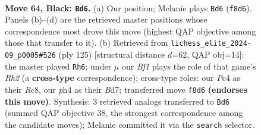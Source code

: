 \documentclass[11pt]{article}
\begin{document}
\begin{figure}[p]\centering
\begin{subfigure}{0.46\textwidth}\centering
\resizebox{\linewidth}{!}{%
\newchessgame
\chessboard[
  setfen={4rb2/5kp1/p6r/PppbBp1p/2p2P1P/4P1P1/1P2K2N/1R4R1 b - - 1 64},
  showmover=false,
  pgfstyle=straightmove, color=movearrow, markmove={f8-d6}
]}
\caption{}
\end{subfigure}\hfill
\begin{subfigure}{0.46\textwidth}\centering
\resizebox{\linewidth}{!}{%
\newchessgame
\chessboard[
  setfen={2r5/3bkp1r/4p1p1/1p1pP2p/pP3P2/P1PR2P1/4BK1P/2R5 b - - 66 63},
  showmover=false,
  pgfstyle=straightmove, color=movearrow, markmove={h7-h6}
]}
\caption{}
\end{subfigure}
\\[4pt]

\caption{\textbf{Move 64, Black: \texttt{Bd6}.} (a) Our position; Melanie plays \texttt{Bd6} (\texttt{f8d6}). Panels (b)--(d) are the retrieved master positions whose correspondence most drove this move (highest QAP objective among those that transfer to it). (b) Retrieved from \texttt{lichess\_elite\_2024-09\_p0005\#526} (ply 125) [structural distance $d$=62, QAP obj=14]: the master played \texttt{Rh6}; under $\mu$ our \emph{Bf1} plays the role of that game's \emph{Rh2} (a \textbf{cross-type} correspondence); cross-type roles: our \emph{P}c4 as their \emph{R}c8, our \emph{p}h4 as their \emph{B}d7; transferred move \texttt{f8d6} \textbf{(endorses this move)}. Synthesis: 3 retrieved analogs transferred to \texttt{Bd6} (summed QAP objective 38, the strongest correspondence among the candidate moves); Melanie committed it via the \texttt{search} selector.}
\label{fig:thought-m127}
\end{figure}

\clearpage
\end{document}
